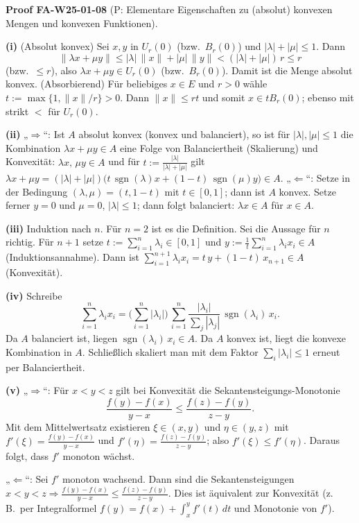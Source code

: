 \documentclass[10pt, letterpaper]{article}
\newcommand{\CustomHeading}[3]{%
  \par\medskip\noindent%
  \textbf{#1 #2} \textnormal{(#3)}.\enskip%
}
\newenvironment{PROOF}[2]{\begin{unitbox}\CustomHeading{Proof}{#1}{#2}}{\end{unitbox}}
\begin{document}
\begin{PROOF}{FA-W25-01-08}{P: Elementare Eigenschaften zu (absolut) konvexen Mengen und konvexen Funktionen}
\textbf{(i)} (Absolut konvex) Sei $x,y$ in $U_r(0)$ (bzw.\ $B_r(0)$) und $|\lambda|+|\mu|\le 1$.
Dann
\[
\|\lambda x+\mu y\|\le |\lambda|\,\|x\|+|\mu|\,\|y\| < (|\lambda|+|\mu|)\,r \le r
\]
(bzw.\ $\le r$), also $\lambda x+\mu y\in U_r(0)$ (bzw.\ $B_r(0)$). Damit ist die Menge absolut konvex.
(Absorbierend) Für beliebiges $x\in E$ und $r>0$ wähle $t:=\max\{1,\|x\|/r\}>0$. Dann
$\|x\| \le rt$ und somit $x\in t B_r(0)$; ebenso mit strikt $<$ für $U_r(0)$.
\medskip

\textbf{(ii)} „$\Rightarrow$“: Ist $A$ absolut konvex (konvex und balanciert), so ist für $|\lambda|,|\mu|\le 1$
die Kombination $\lambda x+\mu y\in A$ eine Folge von Balanciertheit (Skalierung) und Konvexität:
$\lambda x,\,\mu y\in A$ und für $t:=\frac{|\lambda|}{|\lambda|+|\mu|}$ gilt
$\lambda x+\mu y=(|\lambda|+|\mu|)\big(t\,\operatorname{sgn}(\lambda)x+(1-t)\,\operatorname{sgn}(\mu)y\big)\in A$.
„$\Leftarrow$“: Setze in der Bedingung $(\lambda,\mu)=(t,1-t)$ mit $t\in[0,1]$; dann ist $A$ konvex.
Setze ferner $y=0$ und $\mu=0$, $|\lambda|\le 1$; dann folgt balanciert: $\lambda x\in A$ für $x\in A$. 

\medskip
\textbf{(iii)} Induktion nach $n$. Für $n=2$ ist es die Definition. 
Sei die Aussage für $n$ richtig. Für $n+1$ setze
$t:=\sum_{i=1}^{n}\lambda_i\in[0,1]$ und $y:=\frac{1}{t}\sum_{i=1}^{n}\lambda_i x_i\in A$ (Induktionsannahme).
Dann ist $\sum_{i=1}^{n+1}\lambda_i x_i=t\,y+(1-t)\,x_{n+1}\in A$ (Konvexität). 

\medskip
\textbf{(iv)} Schreibe
\[
\sum_{i=1}^{n}\lambda_i x_i=\Big(\sum_{i=1}^{n}|\lambda_i|\Big)\,
\sum_{i=1}^{n}\frac{|\lambda_i|}{\sum_{j}|\lambda_j|}\,\operatorname{sgn}(\lambda_i)\,x_i.
\]
Da $A$ balanciert ist, liegen $\operatorname{sgn}(\lambda_i)\,x_i\in A$. 
Da $A$ konvex ist, liegt die konvexe Kombination in $A$. Schließlich skaliert man 
mit dem Faktor $\sum_i|\lambda_i|\le 1$ erneut per Balanciertheit. 

\medskip
\textbf{(v)} „$\Rightarrow$“: Für $x<y<z$ gilt bei Konvexität die Sekantensteigungs-Monotonie
\[
\frac{f(y)-f(x)}{y-x}\le \frac{f(z)-f(y)}{z-y}.
\]
Mit dem Mittelwertsatz existieren $\xi\in(x,y)$ und $\eta\in(y,z)$ mit
$f'(\xi)=\frac{f(y)-f(x)}{y-x}$ und $f'(\eta)=\frac{f(z)-f(y)}{z-y}$; also $f'(\xi)\le f'(\eta)$.
Daraus folgt, dass $f'$ monoton wächst.

„$\Leftarrow$“: Sei $f'$ monoton wachsend. Dann sind die Sekantensteigungen 
$x<y<z\Rightarrow \frac{f(y)-f(x)}{y-x}\le \frac{f(z)-f(y)}{z-y}$.
Dies ist äquivalent zur Konvexität (z.\,B.\ per Integralformel
$f(y)=f(x)+\int_{x}^{y}f'(t)\,dt$ und Monotonie von $f'$).
\end{PROOF}
\end{document}
